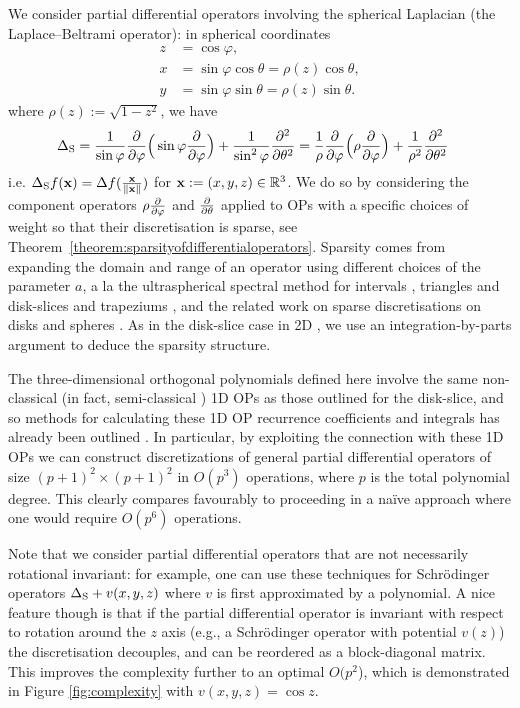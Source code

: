 \documentclass[11pt, oneside]{article}   	%
\begin{document}
We consider partial differential operators involving the spherical Laplacian (the Laplace--Beltrami operator): in spherical coordinates 
\begin{align*}
	z &= \cos\varphi, \\
	x &= \sin\varphi \cos\theta = \rho(z) \cos\theta, \\
	y &= \sin\varphi \sin\theta = \rho(z) \sin\theta.
\end{align*}
where $ \rho(z) := \sqrt{1-z^2}$, we have
\begin{align*}
	\Delta_{\rm S} &= {1 \over \sin\varphi} {\partial \over \partial \varphi} \Big( \sin\varphi {\partial \over \partial \varphi} \Big) + {1 \over \sin^2 \varphi} {\partial^2 \over \partial \theta^2} = {1 \over \rho} {\partial \over \partial \varphi} \Big( \rho {\partial \over \partial \varphi} \Big) + {1 \over \rho^2} {\partial^2 \over \partial \theta^2}
\end{align*}
i.e. $\Delta_{\rm S} f(\mathbf{x}) = \Delta f({\mathbf{x} \over \left\| \mathbf{x} \right\|})$ for $\mathbf{x} := (x,y,z) \in \mathbb{R}^3$. We do so by considering the component operators $\rho {\partial \over \partial \varphi}$ and ${\partial \over \partial \theta}$ applied to OPs with a specific choices of weight so that their discretisation is sparse, see Theorem~\ref{theorem:sparsityofdifferentialoperators}.  Sparsity comes from expanding the domain and range of an operator using different choices of the parameter $a$, a la the ultraspherical spectral method for intervals \cite{olver2013fast}, triangles \cite{olver2019triangle} and disk-slices and trapeziums \cite{snowball2019sparse}, and the related work on sparse discretisations on disks \cite{vasil2016tensor} and spheres \cite{vasil2019tensor,lecoanet2019tensor}.  As in the  disk-slice case in 2D \cite{snowball2019sparse}, we use an integration-by-parts argument to deduce the sparsity structure.

 The three-dimensional orthogonal polynomials defined here involve the same non-classical (in fact, semi-classical \cite[\S5]{magnus1995painleve}) 1D OPs as those outlined for the disk-slice, and so methods for calculating these 1D OP recurrence coefficients and integrals has already been outlined \cite{snowball2019sparse}. In particular, by exploiting the connection with these 1D OPs we can construct discretizations of general partial differential operators of size $(p+1)^2 \times (p+1)^2$ in $O(p^3)$ operations, where $p$ is the total polynomial degree. This clearly compares favourably to proceeding in a na\"ive approach where one would require $O(p^6)$ operations.

Note that we consider partial differential operators that are not necessarily rotational invariant:  for example, one can use these techniques for  Schr\"odinger operators $\Delta_{\rm S} + v(x,y,z)$ where $v$ is first approximated by a polynomial. A nice feature though is that if the partial differential operator is invariant with respect to rotation around the $z$ axis (e.g., a Schr\"odinger operator with potential $v(z)$) the discretisation decouples, and can be reordered as a block-diagonal matrix. This improves the complexity further to an optimal $O(p^2$), which is demonstrated in Figure \ref{fig:complexity} with $v(x,y,z) = \cos z$.
\end{document}
